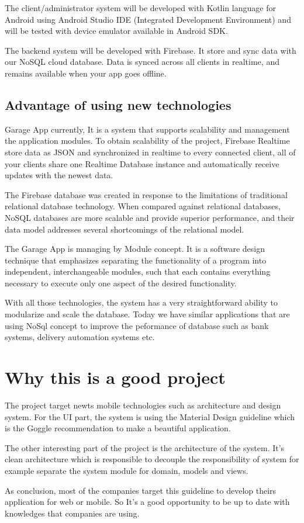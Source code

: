 The client/administrator system will be developed with Kotlin language for Android using Android Studio IDE (Integrated Development Environment) and will be tested with device emulator available in Android SDK.

The backend system will be developed with Firebase. It store and sync data with our NoSQL cloud database. Data is synced across all clients in realtime, and remains available when your app goes offline.

\subsection{Advantage of using new technologies}

Garage App currently, It is a system that supports scalability and management the application modules. To obtain scalability of the project, Firebase Realtime \citep{Reference1} store data as JSON and synchronized in realtime to every connected client, all of your clients share one Realtime Database instance and automatically receive updates with the newest data.

The Firebase database was created in response to the limitations of traditional relational database technology. When compared against relational databases, NoSQL \citep{Reference2}  databases are more scalable and provide superior performance, and their data model addresses several shortcomings of the relational model.

The Garage App is managing by Module concept. It is a software design technique that emphasizes separating the functionality of a program into independent, interchangeable modules, such that each contains everything necessary to execute only one aspect of the desired functionality.

With all those technologies, the system has a very straightforward ability to modularize and scale the database. Today we have similar applications that are using NoSql concept to improve the peformance of database such as bank systems, delivery automation systems etc. 

\section{Why this is a good project}

The project target newts mobile technologies such as architecture  and design system. For the  UI part,  the system is using  the Material Design guideline which is the Goggle recommendation to make a beautiful application.

The other interesting part of the project is the architecture of the system. It's clean architecture which is responsible  to decouple the responsibility of system for example separate the system module for domain, models and views.

As conclusion, most of the companies target this guideline to develop theirs application for web or mobile. So It's a good opportunity to be up to date with knowledges that companies are using.